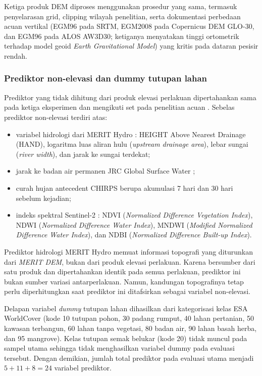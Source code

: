\documentclass[12pt]{article}
\begin{document}
Ketiga produk DEM diproses menggunakan prosedur yang sama, termasuk
penyelarasan grid, clipping wilayah penelitian, serta dokumentasi perbedaan
acuan vertikal (EGM96 pada SRTM, EGM2008 pada Copernicus
DEM GLO-30, dan EGM96 pada ALOS AW3D30; ketiganya menyatakan tinggi
ortometrik terhadap model geoid \textit{Earth Gravitational Model})
yang kritis pada dataran pesisir rendah.

\subsubsection{Prediktor non-elevasi dan dummy tutupan lahan}

Prediktor yang tidak dihitung dari produk elevasi perlakuan dipertahankan
sama pada ketiga eksperimen dan mengikuti set pada penelitian acuan
\cite{hakim2026}. Sebelas prediktor non-elevasi terdiri atas:

\begin{itemize}
\item variabel hidrologi dari MERIT Hydro \cite{yamazaki2019}: HEIGHT
Above Nearest Drainage (HAND), logaritma luas aliran hulu
(\textit{upstream drainage area}), lebar sungai (\textit{river width}), dan
jarak ke sungai terdekat;
\item jarak ke badan air permanen JRC Global Surface Water
\cite{pekel2016};
\item curah hujan antecedent CHIRPS \cite{funk2015} berupa akumulasi 7 hari
dan 30 hari sebelum kejadian;
\item indeks spektral Sentinel-2 \cite{saha2021}: NDVI
(\textit{Normalized Difference Vegetation Index}), NDWI
(\textit{Normalized Difference Water Index}), MNDWI (\textit{Modified
Normalized Difference Water Index}), dan NDBI (\textit{Normalized
Difference Built-up Index}).
\end{itemize}

Prediktor hidrologi MERIT Hydro memuat informasi topografi yang
diturunkan dari \textit{MERIT DEM}, bukan dari produk elevasi perlakuan.
Karena bersumber dari satu produk dan dipertahankan identik pada semua
perlakuan, prediktor ini bukan sumber variasi antarperlakuan. Namun,
kandungan topografinya tetap perlu diperhitungkan saat prediktor ini
ditafsirkan sebagai variabel non-elevasi.

Delapan variabel \textit{dummy} tutupan lahan dihasilkan dari
kategorisasi kelas ESA WorldCover \cite{zanaga2021} (kode 10 tutupan pohon,
30 padang rumput, 40 lahan pertanian, 50 kawasan terbangun, 60 lahan tanpa
vegetasi, 80 badan air, 90 lahan basah herba, dan 95 mangrove). Kelas
tutupan semak belukar (kode 20) tidak muncul pada sampel utama sehingga tidak
menghasilkan variabel dummy pada evaluasi tersebut. Dengan demikian, jumlah
total prediktor pada evaluasi utama menjadi
$5+11+8=24$ variabel prediktor.
\end{document}
